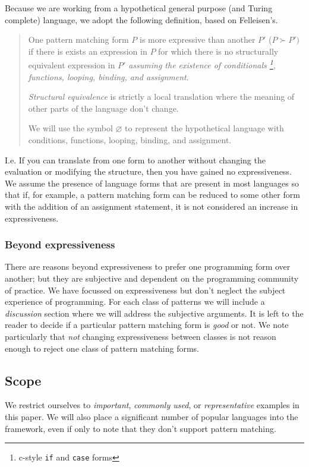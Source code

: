 \documentclass[acmsmall]{acmart}
\begin{document}
Because we are working from a hypothetical general purpose (and Turing complete) language, we adopt the following definition, based on Felleisen's.

\begin{quote}
    One pattern matching form $P$ is more expressive than another $P'$ ($P \succ P')$ if there is exists an expression in $P$ for which there is no structurally equivalent expression in $P'$ \emph{assuming the existence of conditionals \footnote{c-style \lstinline{if} and \lstinline{case} forms}, functions, looping, binding, and assignment}.
    
    \emph{Structural equivalence} is strictly a local translation where the meaning of other parts of the language don't change.
    
    We will use the symbol $\varnothing$ to represent the hypothetical language with conditions, functions, looping, binding, and assignment.
\end{quote}

I.e. If you can translate from one form to another without changing the evaluation or modifying the structure, then you have gained no expressiveness.  We assume the presence of language forms that are present in most languages so that if, for example, a pattern matching form can be reduced to some other form with the addition of an assignment statement, it is not considered an increase in expressiveness.

\subsubsection{Beyond expressiveness}
There are reasons beyond expressiveness to prefer one programming form over another; but they are subjective and dependent on the programming community of practice.  We have focussed on expressiveness but don't neglect the subject experience of programming.  For each class of patterns we will include a \emph{discussion} section where we will address the subjective arguments.  It is left to the reader to decide if a particular pattern matching form is \emph{good} or not.  We note particularly that \emph{not} changing expressiveness between classes is not reason enough to reject one class of pattern matching forms.

\subsection{Scope}
We restrict ourselves to \emph{important}, \emph{commonly used}, or \emph{representative} examples in this paper.  We will also place a significant number of popular languages into the framework, even if only to note that they don't support pattern matching.
\end{document}
